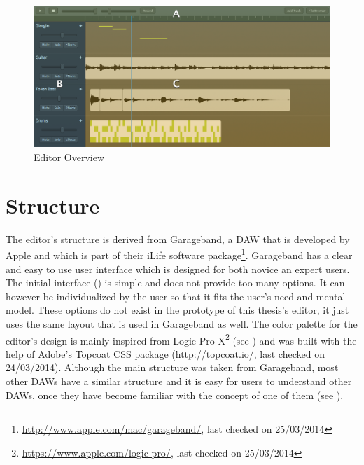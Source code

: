 
\newpage
\begin{landscape}

  \begin{figure}[htb]
    \centerline{\includegraphics[width=\linewidth]{images/editor_overview_sections.png}}
    \caption[Editor Overview]{Editor Overview}
    \label{fig:editor-overview}
  \end{figure}

\end{landscape}
\newpage

\section{Structure}
\label{concept-overview}

The editor's structure is derived from Garageband, a DAW that is developed by Apple and which is part of their iLife software package\footnote{\url{http://www.apple.com/mac/garageband/}, last checked on 25/03/2014}. Garageband has a clear and easy to use user interface which is designed for both novice an expert users. The initial interface () is simple and does not provide too many options. It can however be individualized by the user so that it fits the user's need and mental model. These options do not exist in the prototype of this thesis's editor, it just uses the same layout that is used in Garageband as well. The color palette for the editor's design is mainly inspired from Logic Pro X\footnote{\url{https://www.apple.com/logic-pro/}, last checked on 25/03/2014} (see ) and was built with the help of Adobe's Topcoat CSS package (\url{http://topcoat.io/}, last checked on 24/03/2014). Although the main structure was taken from Garageband, most other DAWs have a similar structure and it is easy for users to understand other DAWs, once they have become familiar with the concept of one of them (see ). 

